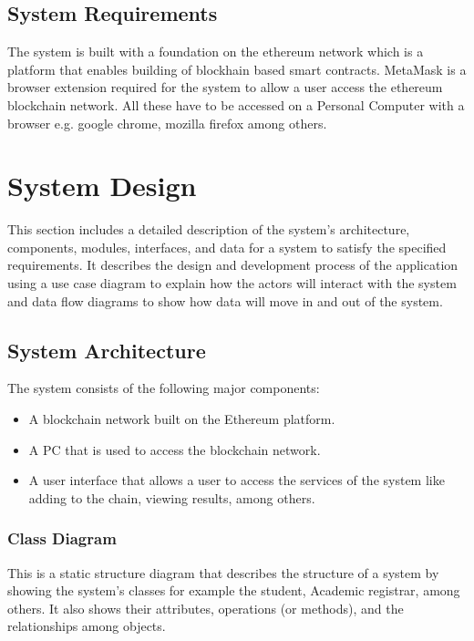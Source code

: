 \subsection{System Requirements}
The system is built with a foundation on the ethereum network which is a platform that enables building of blockhain based smart contracts. MetaMask is a browser extension required for the system to allow a user access the ethereum blockchain network. All these have to be accessed on a Personal Computer with a browser e.g. google chrome, mozilla firefox among others.

\section{System Design}
This section includes a detailed description of the system’s architecture, components, modules, interfaces, and data for a system to satisfy the specified requirements. It describes the design and development process of the application using a use case diagram to explain how the actors will interact with the system and data flow diagrams to show how data will move in and out of the system.  

\subsection{System Architecture}
The system consists of the following major components:

\begin{itemize}
\item A blockchain network built on the Ethereum platform.
\item A PC that is used to access the blockchain network.
\item A user interface that allows a user to access the services of the system like adding to the chain, viewing results, among others.
\end{itemize}

\subsubsection{Class Diagram}
This is a static structure diagram that describes the structure of a system by showing the system's classes for example the student, Academic registrar, among others. It also shows their attributes, operations (or methods), and the relationships among objects.

